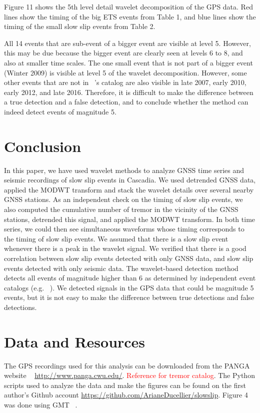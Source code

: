 \documentclass{article}
\begin{document}
Figure 11 shows the 5th level detail wavelet decomposition of the GPS data. Red lines show the timing of the big ETS events from Table 1, and blue lines show the timing of the small slow slip events from Table 2.

All 14 events that are sub-event of a bigger event are visible at level 5. However, this may be due because the bigger event are clearly seen at levels 6 to 8, and also at smaller time scales. The one small event that is not part of a bigger event (Winter 2009) is visible at level 5 of the wavelet decomposition. However, some other events that are not in ~\citet{MIC_2019}'s catalog are also visible in late 2007, early 2010, early 2012, and late 2016. Therefore, it is difficult to make the difference between a true detection and a false detection, and to conclude whether the method can indeed detect events of magnitude 5.

\section{Conclusion}

In this paper, we have used wavelet methods to analyze GNSS time series and seismic recordings of slow slip events in Cascadia. We used detrended GNSS data, applied the MODWT transform and stack the wavelet details over several nearby GNSS stations. As an independent check on the timing of slow slip events, we also computed the cumulative number of tremor in the vicinity of the GNSS stations, detrended this signal, and applied the MODWT transform. In both time series, we could then see simultaneous waveforms whose timing corresponds to the timing of slow slip events. We assumed that there is a slow slip event whenever there is a peak in the wavelet signal. We verified that there is a good correlation between slow slip events detected with only GNSS data, and slow slip events detected with only seismic data. The wavelet-based detection method detects all events of magnitude higher than 6 as determined by independent event catalogs (e.g. ~\citep{MIC_2019}). We detected signals in the GPS data that could be magnitude 5 events, but it is not easy to make the difference between true detections and false detections.

\section*{Data and Resources}

The GPS recordings used for this analysis can be downloaded from the PANGA website ~\citep{PANGA} \url{http://www.panga.cwu.edu/}. \textcolor{red}{Reference for tremor catalog}. The Python scripts used to analyze the data and make the figures can be found on the first author's Github account \url{https://github.com/ArianeDucellier/slowslip}. Figure 4 was done using GMT ~\citep{WES_1991}.
\end{document}
